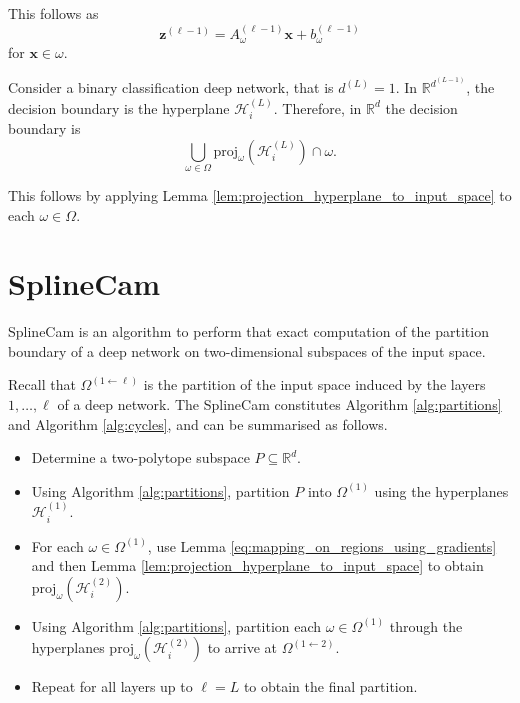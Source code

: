 \begin{tproof}
    This follows as $$\mathbf{z}^{(\ell-1)}=A^{(\ell-1)}_{\omega}\mathbf{x}+b^{(\ell-1)}_{\omega}$$ for $\mathbf{x}\in\omega$.
\end{tproof}

\begin{theorem}
    Consider a binary classification deep network, that is $d^{(L)}=1$. In $\mathbb{R}^{d^{(L-1)}}$, the decision boundary is the hyperplane $\mathcal{H}^{(L)}_i$. Therefore, in $\mathbb{R}^d$ the decision boundary is $$\bigcup_{\omega\in\Omega}\mathrm{proj}_{\omega}\left(\mathcal{H}^{(L)}_i\right)\cap\omega.$$
\end{theorem}

\begin{tproof}
    This follows by applying Lemma \ref{lem:projection_hyperplane_to_input_space} to each $\omega\in\Omega$.
\end{tproof}

\section{SplineCam}\label{sec:splinecam}

SplineCam is an algorithm to perform that exact computation of the partition boundary of a deep network on two-dimensional subspaces of the input space.

Recall that $\Omega^{(1\leftarrow\ell)}$ is the partition of the input space induced by the layers $1,\dots,\ell$ of a deep network. The SplineCam constitutes Algorithm \ref{alg:partitions} and Algorithm \ref{alg:cycles}, and can be summarised as follows.
\begin{itemize}
    \item Determine a two-polytope subspace $P\subseteq\mathbb{R}^d$.
    \item Using Algorithm \ref{alg:partitions}, partition $P$ into $\Omega^{(1)}$ using the hyperplanes $\mathcal{H}^{(1)}_i$.
    \item For each $\omega\in\Omega^{(1)}$, use Lemma \ref{eq:mapping_on_regions_using_gradients} and then Lemma \ref{lem:projection_hyperplane_to_input_space} to obtain $\mathrm{proj}_{\omega}\left(\mathcal{H}^{(2)}_i\right)$.
    \item Using Algorithm \ref{alg:partitions}, partition each $\omega\in\Omega^{(1)}$ through the hyperplanes $\mathrm{proj}_{\omega}\left(\mathcal{H}^{(2)}_i\right)$ to arrive at $\Omega^{(1\leftarrow2)}$.
    \item Repeat for all layers up to $\ell=L$ to obtain the final partition.
\end{itemize}


